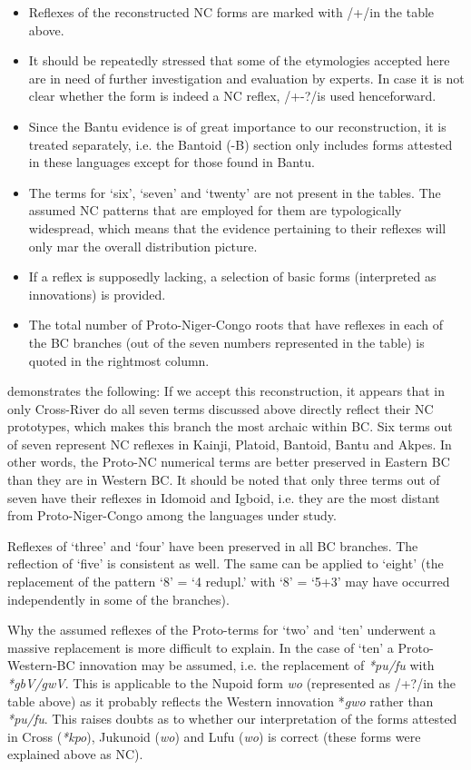 \begin{itemize}
\item  Reflexes of the reconstructed NC forms are marked with /+/in the table above. 
\item  It should be repeatedly stressed that some of the etymologies accepted here are in need of further investigation and evaluation by experts. In case it is not clear whether the form is indeed a NC reflex, /+-?/is used henceforward.
\item  Since the Bantu evidence is of great importance to our reconstruction, it is treated separately, i.e. the Bantoid (-B) section only includes forms attested in these languages except for those found in Bantu.
\sloppy
\item  The terms for ‘six’, ‘seven’ and ‘twenty’ are not present in the tables. The assumed NC patterns that are employed for them are typologically widespread, which means that the evidence pertaining to their reflexes will only mar the overall distribution picture.
\fussy
\item  If a reflex is supposedly lacking, a selection of basic forms (interpreted as innovations) is provided.
\item  The total number of Proto-Niger-Congo roots that have reflexes in each of the BC branches (out of the seven numbers represented in the table) is quoted in the rightmost column.
\end{itemize} 

 demonstrates the following:
If we accept this reconstruction, it appears that in only Cross-River do all seven terms discussed above directly reflect their NC prototypes, which makes this branch the most archaic within BC. Six terms out of seven represent NC reflexes in Kainji, Platoid, Bantoid, Bantu and Akpes. In other words, the Proto-NC numerical terms are better preserved in Eastern BC than they are in Western BC. It should be noted that only three terms out of seven have their reflexes in Idomoid and Igboid, i.e. they are the most distant from Proto-Niger-Congo among the languages under study.

Reflexes of ‘three’ and ‘four’ have been preserved in all BC branches. The reflection of ‘five’ is consistent as well. The same can be applied to ‘eight’ (the replacement of the pattern ‘8’ = ‘4 redupl.’ with ‘8’ = ‘5+3’ may have occurred independently in some of the branches).

Why the assumed reflexes of the Proto-terms for ‘two’ and ‘ten’ underwent a massive replacement is more difficult to explain. In the case of ‘ten’ a Proto-Western-BC innovation may be assumed, i.e. the replacement of \textit{*pu}\textit{/fu} with \textit{*gbV}\textit{/gwV}. This is applicable to the Nupoid form \textit{wo} (represented as /+?/in the table above) as it probably reflects the Western innovation *\textit{gwo} rather than \textit{*pu}\textit{/fu}. This raises doubts as to whether our interpretation of the forms attested in Cross (\textit{*kpo}), Jukunoid (\textit{wo}) and Lufu (\textit{wo}) is correct (these forms were explained above as NC). 

